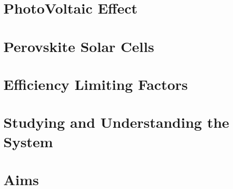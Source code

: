 \section{PhotoVoltaic Effect}

\section{Perovskite Solar Cells}

\section{Efficiency Limiting Factors}

\section{Studying and Understanding the System}

\section{Aims}